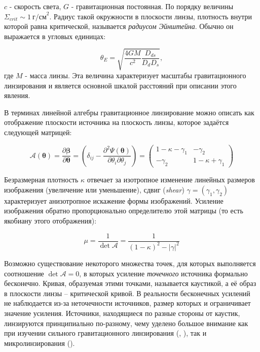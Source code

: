 \noindent $c$ - скорость света, $G$ - гравитационная постоянная. По порядку величины $\Sigma_{crit} \sim 1 \ \textrm{г/см}^2$. Радиус такой окружности в плоскости линзы, плотность внутри которой равна критической, называется \textit{радиусом Эйнштейна}. Обычно он выражается в угловых единицах: 

\begin{equation}\label{eq:r_ein}
\theta_{E}=\sqrt{\frac{4 G M}{c^{2}} \frac{D_{d s}}{D_{d} D_{s}}},
\end{equation}
где $M$ - масса линзы. Эта величина характеризует масштабы гравитационного линзирования и является основной шкалой расстояний при описании этого явления.

В терминах линейной алгебры гравитационное линзирование можно описать как отображение плоскости источника на плоскость линзы, которое задаётся следующей матрицей:

\begin{equation}
\mathcal{A}(\boldsymbol{\theta})=\frac{\partial \boldsymbol{\beta}}{\partial \boldsymbol{\theta}}=\left(\delta_{i j}-\frac{\partial^{2} \Psi(\boldsymbol{\theta})}{\partial \theta_{i} \partial \theta_{j}}\right)=\left(\begin{array}{cc}{1-\kappa-\gamma_{1}} & {-\gamma_{2}} \\ {-\gamma_{2}} & {1-\kappa+\gamma_{1}}\end{array}\right)
\end{equation}

Безразмерная плотность  $\kappa$ отвечает за изотропное изменение линейных размеров изображения (увеличение или уменьшение), сдвиг (\textit{shear}) $\gamma=(\gamma_1,\gamma_2)$ характеризует анизотропное искажение формы изображений. Усиление изображения обратно пропорционально определителю этой матрицы (то есть якобиану этого отображения):

\begin{equation}\label{eq:magnification}
\mu=\frac{1}{\operatorname{det} \mathcal{A}} =  \frac{1}{(1-\kappa)^2-|\gamma|^2}
\end{equation}

Возможно существование некоторого множества точек, для которых выполняется соотношение $\operatorname{det} \mathcal{A}=0$, в которых усиление \textit{точечного} источника формально бесконечно. Кривая, образуемая этими точками, называется каустикой, а её образ в плоскости линзы – критической кривой. В реальности бесконечных усилений не наблюдается из-за неточечности источников, размер которых и ограничивает значение усиления. Источники, находящиеся по разные стороны от каустик, линзируются принципиально по-разному, чему уделено большое внимание как при изучении сильного гравитационного линзирования (\cite{blandfordnarayan1986}, \cite{narayanwallington1992}), так и микролинзирования (\cite{wambsganss1992-microlens}).

